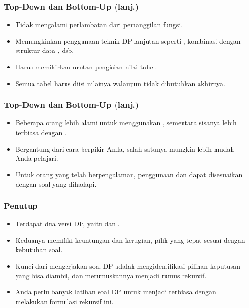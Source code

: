 \begin{frame}
\frametitle{Top-Down dan Bottom-Up (lanj.)}
\fBottomup
\begin{itemize}
  \item Tidak mengalami perlambatan dari \foverhead pemanggilan fungsi.
  \item Memungkinkan penggunaan teknik DP lanjutan seperti , kombinasi dengan struktur data , dsb.
  \item Harus memikirkan urutan pengisian nilai tabel.
  \item Semua tabel harus diisi nilainya walaupun tidak dibutuhkan akhirnya.
\end{itemize}
\end{frame}

\begin{frame}
\frametitle{Top-Down dan Bottom-Up (lanj.)}
\begin{itemize}
  \item Beberapa orang lebih alami untuk menggunakan \ftopdown, sementara sisanya lebih terbiasa dengan \fbottomup.
  \item Bergantung dari cara berpikir Anda, salah satunya mungkin lebih mudah Anda pelajari.
  \item Untuk orang yang telah berpengalaman, penggunaan \fbottomup dan \ftopdown dapat disesuaikan dengan soal yang dihadapi.
\end{itemize}
\end{frame}

\begin{frame}
\frametitle{Penutup}
\begin{itemize}
  \item Terdapat dua versi DP, yaitu \ftopdown dan \fbottomup.
  \item Keduanya memiliki keuntungan dan kerugian, pilih yang tepat sesuai dengan kebutuhan soal.
  \item Kunci dari mengerjakan soal DP adalah mengidentifikasi pilihan keputusan yang bisa diambil, dan merumuskannya menjadi rumus rekursif.
  \item Anda perlu banyak latihan soal DP untuk menjadi terbiasa dengan melakukan formulasi rekursif ini.
\end{itemize}
\end{frame}


